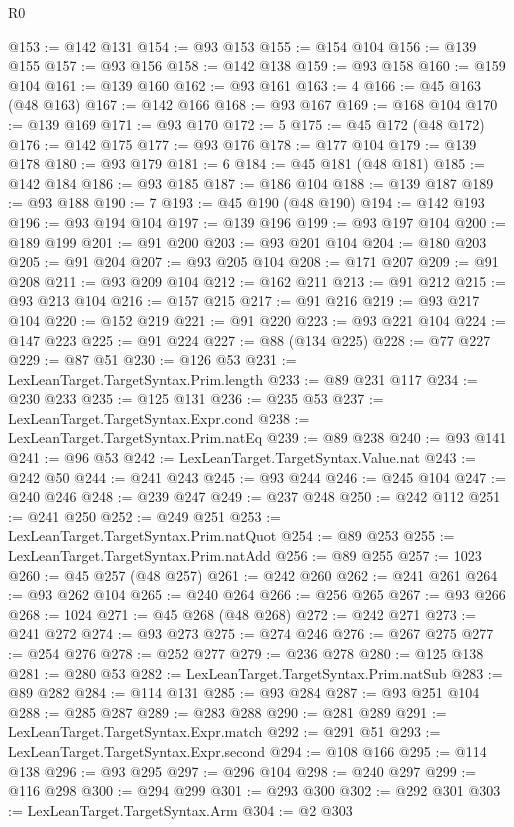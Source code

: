 \begin{lexlean}{R0}
\begin{coremodule}
@153 := @142 @131
@154 := @93 @153
@155 := @154 @104
@156 := @139 @155
@157 := @93 @156
@158 := @142 @138
@159 := @93 @158
@160 := @159 @104
@161 := @139 @160
@162 := @93 @161
@163 := 4
@166 := @45 @163 (@48 @163)
@167 := @142 @166
@168 := @93 @167
@169 := @168 @104
@170 := @139 @169
@171 := @93 @170
@172 := 5
@175 := @45 @172 (@48 @172)
@176 := @142 @175
@177 := @93 @176
@178 := @177 @104
@179 := @139 @178
@180 := @93 @179
@181 := 6
@184 := @45 @181 (@48 @181)
@185 := @142 @184
@186 := @93 @185
@187 := @186 @104
@188 := @139 @187
@189 := @93 @188
@190 := 7
@193 := @45 @190 (@48 @190)
@194 := @142 @193
@196 := @93 @194 @104
@197 := @139 @196
@199 := @93 @197 @104
@200 := @189 @199
@201 := @91 @200
@203 := @93 @201 @104
@204 := @180 @203
@205 := @91 @204
@207 := @93 @205 @104
@208 := @171 @207
@209 := @91 @208
@211 := @93 @209 @104
@212 := @162 @211
@213 := @91 @212
@215 := @93 @213 @104
@216 := @157 @215
@217 := @91 @216
@219 := @93 @217 @104
@220 := @152 @219
@221 := @91 @220
@223 := @93 @221 @104
@224 := @147 @223
@225 := @91 @224
@227 := @88 (@134 @225)
@228 := @77 @227
@229 := @87 @51
@230 := @126 @53
@231 := LexLeanTarget.TargetSyntax.Prim.length
@233 := @89 @231 @117
@234 := @230 @233
@235 := @125 @131
@236 := @235 @53
@237 := LexLeanTarget.TargetSyntax.Expr.cond
@238 := LexLeanTarget.TargetSyntax.Prim.natEq
@239 := @89 @238
@240 := @93 @141
@241 := @96 @53
@242 := LexLeanTarget.TargetSyntax.Value.nat
@243 := @242 @50
@244 := @241 @243
@245 := @93 @244
@246 := @245 @104
@247 := @240 @246
@248 := @239 @247
@249 := @237 @248
@250 := @242 @112
@251 := @241 @250
@252 := @249 @251
@253 := LexLeanTarget.TargetSyntax.Prim.natQuot
@254 := @89 @253
@255 := LexLeanTarget.TargetSyntax.Prim.natAdd
@256 := @89 @255
@257 := 1023
@260 := @45 @257 (@48 @257)
@261 := @242 @260
@262 := @241 @261
@264 := @93 @262 @104
@265 := @240 @264
@266 := @256 @265
@267 := @93 @266
@268 := 1024
@271 := @45 @268 (@48 @268)
@272 := @242 @271
@273 := @241 @272
@274 := @93 @273
@275 := @274 @246
@276 := @267 @275
@277 := @254 @276
@278 := @252 @277
@279 := @236 @278
@280 := @125 @138
@281 := @280 @53
@282 := LexLeanTarget.TargetSyntax.Prim.natSub
@283 := @89 @282
@284 := @114 @131
@285 := @93 @284
@287 := @93 @251 @104
@288 := @285 @287
@289 := @283 @288
@290 := @281 @289
@291 := LexLeanTarget.TargetSyntax.Expr.match
@292 := @291 @51
@293 := LexLeanTarget.TargetSyntax.Expr.second
@294 := @108 @166
@295 := @114 @138
@296 := @93 @295
@297 := @296 @104
@298 := @240 @297
@299 := @116 @298
@300 := @294 @299
@301 := @293 @300
@302 := @292 @301
@303 := LexLeanTarget.TargetSyntax.Arm
@304 := @2 @303

\end{coremodule}
\end{lexlean}
